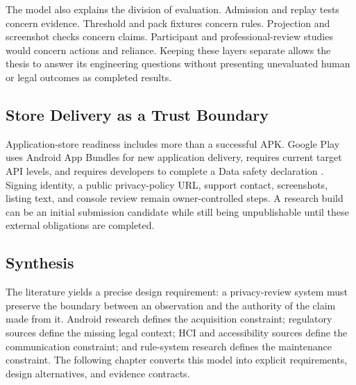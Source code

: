 The model also explains the division of evaluation. Admission and replay tests concern evidence. Threshold and pack fixtures concern rules. Projection and screenshot checks concern claims. Participant and professional-review studies would concern actions and reliance. Keeping these layers separate allows the thesis to answer its engineering questions without presenting unevaluated human or legal outcomes as completed results.

\subsection{Store Delivery as a Trust Boundary}

Application-store readiness includes more than a successful APK. Google Play uses Android App Bundles for new application delivery, requires current target API levels, and requires developers to complete a Data safety declaration \cite{androidbundle2026,playtarget2026,playdatasafety2026}. Signing identity, a public privacy-policy URL, support contact, screenshots, listing text, and console review remain owner-controlled steps. A research build can be an initial submission candidate while still being unpublishable until these external obligations are completed.

\subsection{Synthesis}

The literature yields a precise design requirement: a privacy-review system must preserve the boundary between an observation and the authority of the claim made from it. Android research defines the acquisition constraint; regulatory sources define the missing legal context; HCI and accessibility sources define the communication constraint; and rule-system research defines the maintenance constraint. The following chapter converts this model into explicit requirements, design alternatives, and evidence contracts.
